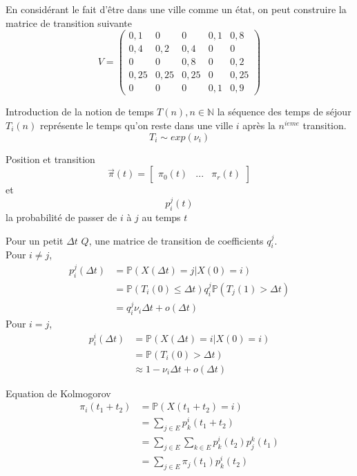 \documentclass{beamer}
\theoremstyle{plain}
\theoremstyle{definition}
\theoremstyle{remark}
\begin{document}
\begin{frame}{}
En considérant le fait d'être dans une ville comme un état, on peut construire la matrice de transition suivante
$$
V=\begin{pmatrix}
0,1 &0& 0& 0,1 & 0,8\\
0,4 &0,2& 0,4& 0 & 0\\
0 &0& 0,8& 0 & 0,2\\
0,25 &0,25& 0,25& 0 & 0,25\\
0 &0& 0& 0,1 & 0,9
\end{pmatrix}
$$
\end{frame}{}
\begin{frame}{Introduction de la notion de temps}
    ${T(n), n\in\mathbb{N}}$ la séquence des temps de séjour\\
     $T_i(n)$ représente le temps qu'on reste dans une ville $i$ après la $n^{ieme}$ transition.\\
     $$T_i\sim exp(\nu_i)$$
   
\end{frame}
\begin{frame}{Position et transition}
      $$\vec{\pi}(t)=\begin{bmatrix}
\pi_0(t)&...&\pi_r(t)
\end{bmatrix} $$
et $$p_i^j(t)$$ la probabilité de passer de $i$ à $j$ au temps $t$

\end{frame}
\begin{frame}{Pour un petit $\Delta t$}
   $Q$, une matrice de transition de coefficients $q_i^j$.\\
Pour $i\neq j$,\\

\begin{align*}
p_i^j(\Delta t)&=\mathbb{P}(X(\Delta t)=j|X(0)=i) \\
&=\mathbb{P}(T_i(0)\leqslant\Delta t)q_i^j\mathbb{P}(T_j(1)>\Delta t)\\
&=q_i^j\nu_i\Delta t+o(\Delta t)
\end{align*}
Pour $i=j$,\\
\begin{align*}
p_i^i(\Delta t)&=\mathbb{P}(X(\Delta t)=i|X(0)=i)\\
&=\mathbb{P}(T_i(0)>\Delta t)\\
&\approx 1-\nu_i\Delta t+o(\Delta t)
\end{align*}
\end{frame}
\begin{frame}{Equation de Kolmogorov}
    \begin{align*}
\pi_i(t_1+t_2)&=\mathbb{P}(X(t_1+t_2)=i)\\
&=\sum_{j\in E}p_k^i(t_1+t_2)\\
&=\sum_{j\in E}\sum_{k\in E}p_k^i(t_2)p_j^k(t_1)\\
&=\sum_{j\in E}\pi_j(t_1)p_k^i(t_2)
\end{align*}
\end{frame}
\end{document}
